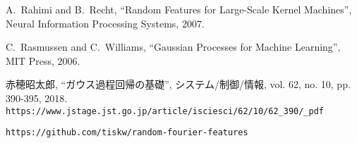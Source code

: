 %

\begin{thebibliography}{9}

    A.~Rahimi and B.~Recht, 
    ``Random Features for Large-Scale Kernel Machines'',
    Neural Information Processing Systems, 2007.

    C.~Rasmussen and C.~Williams, ``Gaussian Processes for Machine Learning'', MIT Press, 2006.

    赤穂昭太郎, ``ガウス過程回帰の基礎'', システム/制御/情報, vol. 62, no. 10, pp. 390-395, 2018.
    {\footnotesize\tt https://www.jstage.jst.go.jp/article/isciesci/62/10/62\_390/\_pdf}

     {\tt https://github.com/tiskw/random-fourier-features}

\end{thebibliography}

